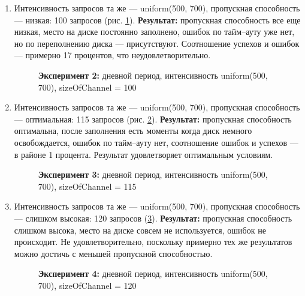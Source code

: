 \begin{itemize}
\begin{enumerate}
        \item Интенсивность запросов та же --- uniform(500, 700), пропускная способность --- низкая:
        100 запросов (рис. \ref{aft2}). \textbf{Результат:} пропускная способность все еще низкая,
        место на диске постоянно заполнено, ошибок по тайм--ауту уже нет, но по переполнению диска --- присутствуют.
        Соотношение успехов и ошибок --- примерно 17 процентов, что неудовлетворительно.
        \begin{figure} [h]
            \caption{\textbf{Эксперимент 2:} дневной период, интенсивность uniform(500, 700), sizeOfChannel = 100}
            \label{aft2}
        \end{figure}

        \item Интенсивность запросов та же --- uniform(500, 700), пропускная способность --- оптимальная:
        115 запросов (рис. \ref{aft3}). \textbf{Результат:} пропускная способность оптимальна, после заполнения
        есть моменты когда диск немного освобождается, ошибок по тайм--ауту нет, соотношение ошибок и успехов ---
        в районе 1 процента. Результат удовлетворяет оптимальным условиям.
        \begin{figure} [h]
            \caption{\textbf{Эксперимент 3:} дневной период, интенсивность uniform(500, 700), sizeOfChannel = 115}
            \label{aft3}
        \end{figure}

        \item Интенсивность запросов та же --- uniform(500, 700), пропускная способность --- слишком высокая:
        120 запросов (\ref{aft4}). \textbf{Результат:} пропускная способность слишком высока, место на диске совсем
        не используется, ошибок не происходит. Не удовлетворительно, поскольку примерно тех же результатов можно
        достичь с меньшей пропускной способностью.
        \begin{figure} [h]
            \caption{\textbf{Эксперимент 4:} дневной период, интенсивность uniform(500, 700), sizeOfChannel = 120}
            \label{aft4}
        \end{figure}
    \end{enumerate}


\end{itemize}
